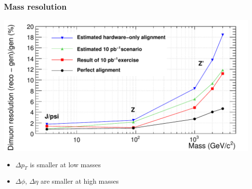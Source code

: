 \documentclass[compress]{beamer}
\begin{document}
\begin{frame}
\frametitle{Mass resolution}

\includegraphics[width=\linewidth]{mass_resolution.pdf}

\vspace{0.5 cm}
\begin{itemize}\setlength{\itemsep}{0.2 cm}
\item $\Delta p_T$ is smaller at low masses

\item $\Delta \phi$, $\Delta \eta$ are smaller at high masses
\end{itemize}
\end{frame}
\end{document}
